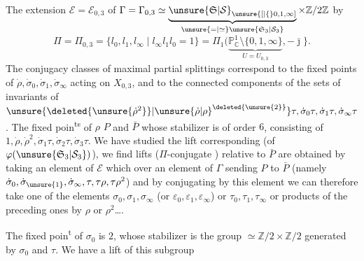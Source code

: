 The extension $\mathcal E=\mathcal E_{0,3}$ of $\Gamma=\Gamma_{0,3}\simeq\underbrace{\unsure{\mathfrak S|\mathcal S}_{\unsure{[|\{}0,1,\infty]}}_{\unsure{=|\simeq}\unsure{\mathfrak S_3|\mathcal S_3}}\times\mathbb Z/2\mathbb Z$
by
\[
\Pi=\Pi_{0,3}=\{l_0,l_1,l_\infty\mid l_\infty l_1l_0=1\}=\Pi_1(\underbrace{\mathbb P^1_{\mathbb C}\setminus\{0,1,\infty\}}_{U=U_{0,3}},-\bar{\jmath}\}.
\]
The conjugacy classes  of maximal partial splittings correspond to the fixed points of $\dot\rho,\dot\sigma_0,\dot\sigma_1,\dot\sigma_\infty$ acting on $X_{0,3}$, and to the  connected components of the sets of invariants of $\unsure{\deleted{\unsure{\dot\rho^2}}|{\unsure{\dot\rho|\rho}}^{\deleted{\unsure{2}}}}\tau,\dot\sigma_0\tau,\dot\sigma_1\tau,\dot\sigma_\infty\tau$. The fixed poin\textsuperscript{ts} of $\rho$  $P$ and $\bar P$ whose stabilizer is of order $6$,  consisting of $1,\dot\rho,\dot\rho^2,\dot\sigma_1\tau,\dot\sigma_2\tau,\dot\sigma_3\tau$. We have studied the lift corresponding  (of $\varphi(\unsure{\mathfrak S_3|\mathcal S_3})$), we find lifts ($\Pi$-conjugate ) relative to $\bar P$ are obtained by  taking an element of $\mathcal E$  which  over an element of $\Gamma$ sending $P$ to $\bar P$ (namely $\dot\sigma_0,\dot\sigma_{\unsure{1}},\dot\sigma_\infty,\tau,\tau\rho,\tau\rho^2$) and by conjugating by this element we can therefore take  one of the elements $\sigma_0,\sigma_1,\sigma_\infty$ (or $\varepsilon_0,\varepsilon_1,\varepsilon_\infty$) or $\tau_0,\tau_1,\tau_\infty$ or  products of the preceding ones by  $\rho$ or $\rho^2$\ldots.

The  fixed poin\textsuperscript{t} of $\sigma_0$ is $2$, whose stabilizer is the group $\simeq\mathbb Z/2\times\mathbb Z/2$ generated by $\sigma_0$ and $\tau$. We have a lift of this subgroup
